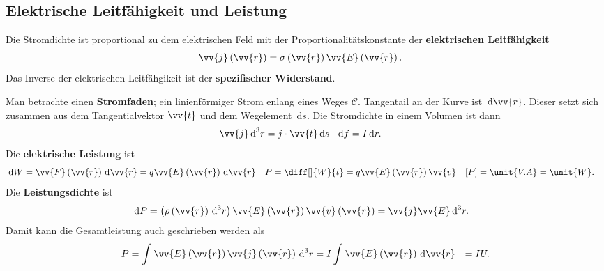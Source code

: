 \documentclass[a4paper,12pt]{article}
\newcommand{\td}{\,\text{d}}
\numberwithin{equation}{section}
\begin{document}
\subsection{Elektrische Leitfähigkeit und Leistung}
Die Stromdichte ist proportional zu dem elektrischen Feld mit der Proportionalitätskonstante der \textbf{elektrischen Leitfähigkeit} 
\begin{align} 
        \vv{j}\left(\vv{r}\right)&=\sigma \left(\vv{r}\right)\vv{E}\left(\vv{r}\right)
.\end{align} 
Das Inverse der elektrischen Leitfähgikeit ist der \textbf{spezifischer Widerstand}.\par
Man betrachte einen \textbf{Stromfaden}; ein linienförmiger Strom enlang eines Weges $\mathcal{C}$. 
Tangentail an der Kurve ist $\td \vv{r}$. 
Dieser setzt sich zusammen aus dem Tangentialvektor $\vv{t}$ und dem Wegelement $\td s$. 
Die Stromdichte in einem Volumen ist dann
\begin{align} 
        \vv{j}\td ^3r&=j\cdot \vv{t}\td s\cdot \td f=I\td r
.\end{align} 
Die \textbf{elektrische Leistung} ist
\begin{align} 
        \td W&=\vv{F}\left(\vv{r}\right)\td \vv{r}=q\vv{E}\left(\vv{r}\right)\td \vv{r}&P&=\diff[]{W}{t}=q\vv{E}\left(\vv{r}\right)\vv{v}&[P]&=\unit{V.A}=\unit{W}
.\end{align} 
Die \textbf{Leistungsdichte} ist
\begin{align} 
        \td P&=\left(\rho \left(\vv{r}\right)\td ^3r\right)\vv{E}\left(\vv{r}\right)\vv{v}\left(\vv{r}\right)=\vv{j}\vv{E}\td ^3r
.\end{align} 
Damit kann die Gesamtleistung auch geschrieben werden als
\begin{align} 
        P&=\int_{}^{}\vv{E}\left(\vv{r}\right)\vv{j}\left(\vv{r}\right)\td ^3r=I\int_{}^{}\vv{E}\left(\vv{r}\right)\td \vv{r}&=IU
.\end{align} 
\end{document}
